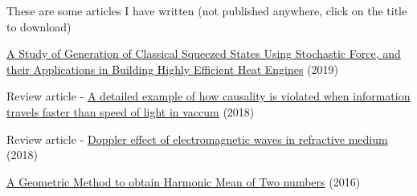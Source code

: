 

\begin{cventries}

  \cventry
    {These are some articles I have written (not published anywhere, click on the title to download)} %
    {} %
    {} %
    {} %
    {
      \begin{cvitems} %
      	\item{\href{https://github.com/apandada1/apandada1.github.io/raw/master/articles/nanoheatengines.pdf}{A Study of Generation of Classical Squeezed States Using Stochastic Force, and their Applications in Building Highly Efficient Heat Engines} (2019)}
        \item {Review article - \href{http://archisman.tk/articles/tachyon.pdf}{A detailed example of how causality is violated when information travels faster than speed of light in vaccum} (2018)}
        \item{Review article - \href{http://archisman.tk/articles/doppler_effect.pdf}{Doppler effect of electromagnetic waves in refractive medium} (2018)}
        \item{\href{http://archisman.tk/articles/Harmonic_Mean.pdf}{A Geometric Method to obtain Harmonic Mean of Two numbers} (2016)}
      \end{cvitems}
    }
\end{cventries}
